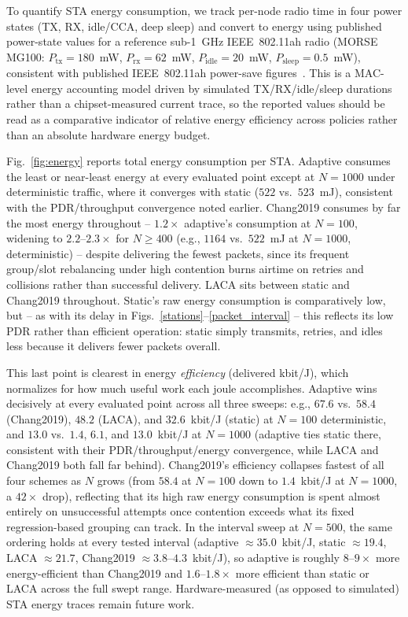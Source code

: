 \documentclass[journal]{IEEEtran}
\begin{document}
\begingroup\color{red}
To quantify STA energy consumption, we track per-node radio time in four power states (TX, RX, idle/CCA, deep sleep) and convert to energy using published power-state values for a reference sub-1~GHz IEEE~802.11ah radio (MORSE MG100: $P_{\mathrm{tx}}=180$~mW, $P_{\mathrm{rx}}=62$~mW, $P_{\mathrm{idle}}=20$~mW, $P_{\mathrm{sleep}}=0.5$~mW), consistent with published IEEE~802.11ah power-save figures~\cite{Khorov2019Tutorial}. This is a MAC-level energy accounting model driven by simulated TX/RX/idle/sleep durations rather than a chipset-measured current trace, so the reported values should be read as a comparative indicator of relative energy efficiency across policies rather than an absolute hardware energy budget.

Fig.~\ref{fig:energy} reports total energy consumption per STA. Adaptive consumes the least or near-least energy at every evaluated point except at $N=1000$ under deterministic traffic, where it converges with static ($522$ vs.\ $523$~mJ), consistent with the PDR/throughput convergence noted earlier. Chang2019 consumes by far the most energy throughout -- $1.2\times$ adaptive's consumption at $N=100$, widening to $2.2$--$2.3\times$ for $N\ge400$ (e.g., $1164$ vs.\ $522$~mJ at $N=1000$, deterministic) -- despite delivering the fewest packets, since its frequent group/slot rebalancing under high contention burns airtime on retries and collisions rather than successful delivery. LACA sits between static and Chang2019 throughout. Static's raw energy consumption is comparatively low, but -- as with its delay in Figs.~\ref{stations}--\ref{packet_interval} -- this reflects its low PDR rather than efficient operation: static simply transmits, retries, and idles less because it delivers fewer packets overall.

This last point is clearest in energy \emph{efficiency} (delivered kbit/J), which normalizes for how much useful work each joule accomplishes. Adaptive wins decisively at every evaluated point across all three sweeps: e.g., $67.6$ vs.\ $58.4$ (Chang2019), $48.2$ (LACA), and $32.6$~kbit/J (static) at $N=100$ deterministic, and $13.0$ vs.\ $1.4$, $6.1$, and $13.0$~kbit/J at $N=1000$ (adaptive ties static there, consistent with their PDR/throughput/energy convergence, while LACA and Chang2019 both fall far behind). Chang2019's efficiency collapses fastest of all four schemes as $N$ grows (from $58.4$ at $N=100$ down to $1.4$~kbit/J at $N=1000$, a $42\times$ drop), reflecting that its high raw energy consumption is spent almost entirely on unsuccessful attempts once contention exceeds what its fixed regression-based grouping can track. In the interval sweep at $N=500$, the same ordering holds at every tested interval (adaptive $\approx35.0$~kbit/J, static $\approx19.4$, LACA $\approx21.7$, Chang2019 $\approx3.8$--$4.3$~kbit/J), so adaptive is roughly $8$--$9\times$ more energy-efficient than Chang2019 and $1.6$--$1.8\times$ more efficient than static or LACA across the full swept range. Hardware-measured (as opposed to simulated) STA energy traces remain future work.
\end{document}
